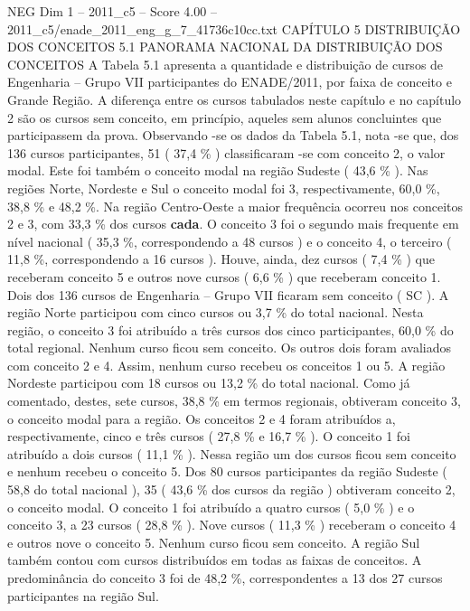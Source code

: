 \begin{textsample}{NEG Dim 1 – 2011\_c5 – Score 4.00 – 2011\_c5/enade\_2011\_eng\_g\_7\_41736c10cc.txt}  \label{ex:f1_neg_316}
CAPÍTULO 5 DISTRIBUIÇÃO DOS CONCEITOS 5.1 PANORAMA NACIONAL DA DISTRIBUIÇÃO DOS CONCEITOS A Tabela 5.1 apresenta a quantidade e distribuição de cursos de Engenharia – Grupo VII participantes do ENADE/2011, por faixa de conceito e Grande Região.
A diferença entre os cursos tabulados neste capítulo e no capítulo 2 são os cursos sem conceito, em princípio, aqueles sem alunos concluintes que participassem da prova.
Observando -se os dados da Tabela 5.1, nota -se que, dos 136 cursos participantes, 51 ( 37,4 \% ) classificaram -se com conceito 2, o valor modal.
Este foi também o conceito modal na região Sudeste ( 43,6 \% ).
Nas regiões Norte, Nordeste e Sul o conceito modal foi 3, respectivamente, 60,0 \%, 38,8 \% e 48,2 \%.
Na região Centro-Oeste a maior frequência ocorreu nos conceitos 2 e 3, com 33,3 \% dos cursos \textbf{cada}.
O conceito 3 foi o segundo mais frequente em nível nacional ( 35,3 \%, correspondendo a 48 cursos ) e o conceito 4, o terceiro ( 11,8 \%, correspondendo a 16 cursos ).
Houve, ainda, dez cursos ( 7,4 \% ) que receberam conceito 5 e outros nove cursos ( 6,6 \% ) que receberam conceito 1.
Dois dos 136 cursos de Engenharia – Grupo VII ficaram sem conceito ( SC ).
A região Norte participou com cinco cursos ou 3,7 \% do total nacional.
Nesta região, o conceito 3 foi atribuído a três cursos dos cinco participantes, 60,0 \% do total regional.
Nenhum curso ficou sem conceito.
Os outros dois foram avaliados com conceito 2 e 4.
Assim, nenhum curso recebeu os conceitos 1 ou 5.
A região Nordeste participou com 18 cursos ou 13,2 \% do total nacional.
Como já comentado, destes, sete cursos, 38,8 \% em termos regionais, obtiveram conceito 3, o conceito modal para a região.
Os conceitos 2 e 4 foram atribuídos a, respectivamente, cinco e três cursos ( 27,8 \% e 16,7 \% ).
O conceito 1 foi atribuído a dois cursos ( 11,1 \% ).
Nessa região um dos cursos ficou sem conceito e nenhum recebeu o conceito 5.
Dos 80 cursos participantes da região Sudeste ( 58,8 do total nacional ), 35 ( 43,6 \% dos cursos da região ) obtiveram conceito 2, o conceito modal.
O conceito 1 foi atribuído a quatro cursos ( 5,0 \% ) e o conceito 3, a 23 cursos ( 28,8 \% ).
Nove cursos ( 11,3 \% ) receberam o conceito 4 e outros nove o conceito 5.
Nenhum curso ficou sem conceito.
A região Sul também contou com cursos distribuídos em todas as faixas de conceitos.
A predominância do conceito 3 foi de 48,2 \%, correspondentes a 13 dos 27 cursos participantes na região Sul.

\end{textsample}
